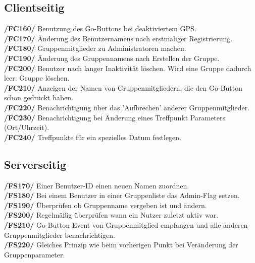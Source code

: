 \subsection{Clientseitig}
     \textbf{/FC160/} Benutzung des Go-Buttons bei deaktiviertem GPS.\\
     \textbf{/FC170/} Änderung des Benutzernamens nach erstmaliger Registrierung.\\
     \textbf{/FC180/} Gruppenmitglieder zu Administratoren machen.\\
     \textbf{/FC190/} Änderung des Gruppennamens nach Erstellen der Gruppe.\\
     \textbf{/FC200/} Benutzer nach langer Inaktivität löschen. Wird eine Gruppe dadurch leer: Gruppe löschen.\\
     \textbf{/FC210/} Anzeigen der Namen von Gruppenmitgliedern, die den Go-Button schon gedrückt haben.\\
     \textbf{/FC220/} Benachrichtigung über das 'Aufbrechen' anderer Gruppenmitglieder.\\
     \textbf{/FC230/} Benachrichtigung bei Änderung eines Treffpunkt Parameters (Ort/Uhrzeit).\\
     \textbf{/FC240/} Treffpunkte für ein spezielles Datum festlegen.\\
\subsection{Serverseitig}
     \textbf{/FS170/} Einer Benutzer-ID einen neuen Namen zuordnen.\\
     \textbf{/FS180/} Bei einem Benutzer in einer Gruppenliste das Admin-Flag setzen.\\
     \textbf{/FS190/} Überprüfen ob Gruppenname vergeben ist und ändern.\\
     \textbf{/FS200/} Regelmäßig überprüfen wann ein Nutzer zuletzt aktiv war.\\
     \textbf{/FS210/} Go-Button Event von Gruppenmitglied empfangen und alle anderen Gruppenmitglieder benachrichtigen.\\
     \textbf{/FS220/} Gleiches Prinzip wie beim vorherigen Punkt bei Veränderung der Gruppenparameter.\\
